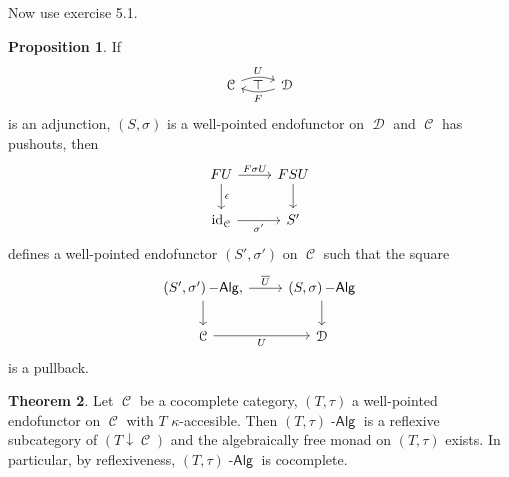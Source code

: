 \documentclass[a4paper,11pt,oneside,openany]{scrbook}
\DeclareMathOperator{\Alg}{-\mathsf{Alg}}
\DeclareMathOperator{\C}{\mathcal{C}}
\DeclareMathOperator{\D}{\mathcal{D}}
\DeclareMathOperator{\id}{id}
\theoremstyle{definition}
\newtheorem{thm}{Theorem}[section] %
\theoremstyle{definition}
\newtheorem{prop}[thm]{Proposition}
\begin{document}
Now use exercise 5.1.
\begin{prop}
    If
    \begin{displaymath}
        \begin{tikzcd}
	\C \arrow[r, "U", bend left=20]
	    \arrow[from=r, "F", bend left=20]
	    \arrow[r, phantom, "\top"]
	    & \D
        \end{tikzcd}
    \end{displaymath}
    is an adjunction, $ (S,\sigma) $ is a well-pointed endofunctor on $ \D $
    and $ \C $ has pushouts, then
    \begin{displaymath}
        \begin{tikzcd}
	    FU \arrow[r,"F\sigma U"]\arrow[d, "\epsilon"]& FSU \arrow[d]\\
	    \id_{\C} \arrow[r, "\sigma'"']& S'
        \end{tikzcd}
    \end{displaymath}
    defines a well-pointed endofunctor $ (S',\sigma') $ on $ \C $ such that the square
    \begin{displaymath}
        \begin{tikzcd}
	    (S',\sigma')\Alg \arrow[r, "\overline U"],\arrow[d]
	    & (S,\sigma)\Alg \arrow[d]\\
	    \C \arrow[r, "U"'] & \D
        \end{tikzcd}
    \end{displaymath}
    is a pullback.\hfill\qedsymbol
\end{prop}
\begin{thm}
    Let $ \C $ be a cocomplete category, $ (T,\tau) $ a well-pointed endofunctor on $ \C $ with $ T $ $ \kappa $-accesible.
    Then $ (T,\tau)\Alg $ is a reflexive subcategory of $ (T\downarrow\C)$ and the algebraically free monad on $ (T,\tau) $ exists. In particular, by reflexiveness, $ (T,\tau)\Alg $ is cocomplete.
\end{thm}
\end{document}
